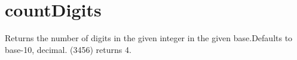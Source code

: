 \hypertarget{countDigits-example}{}\section{count\+Digits}
Returns the number of digits in the given integer in the given base.\+Defaults to base-\/10, decimal. (3456) returns 4.


\begin{DoxyCodeInclude}
\end{DoxyCodeInclude}
 